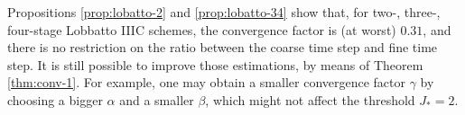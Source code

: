 %
%

\begin{remark}
Propositions \ref{prop:lobatto-2} and \ref{prop:lobatto-34} show that, for two-, three-, four-stage Lobbatto IIIC schemes, the convergence factor is (at worst) $0.31$,
and there is no restriction
on the ratio between the coarse time step and fine
time step.
It is still possible to improve those estimations, by means of Theorem \ref{thm:conv-1}.
For example, one may obtain a smaller
convergence factor $\gamma$ by choosing a bigger $\alpha$ and
a smaller $\beta$, which might not affect the threshold $J_*=2$.
\end{remark}

